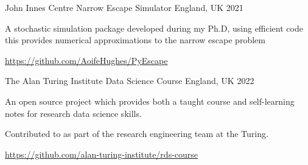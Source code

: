 \begin{cventries}
  \cventry
    {John Innes Centre} %
    {Narrow Escape Simulator} %
    {England, UK} %
    {2021} %
    {
      \begin{cvitems} %
        \item {A stochastic simulation package developed during my Ph.D, using efficient code this provides numerical approximations to the narrow escape problem}
        \item {\url{https://github.com/AoifeHughes/PyEscape}}
      \end{cvitems}
    }

  \cventry
    {The Alan Turing Institute} %
    {Data Science Course} %
    {England, UK} %
    {2022} %
    {
      \begin{cvitems} %
        \item {An open source project which provides both a taught course and self-learning notes for research data science skills.}
        \item{Contributed to as part of the research engineering team at the Turing.}
        \item {\url{https://github.com/alan-turing-institute/rds-course}}
      \end{cvitems}
    }

\end{cventries}
